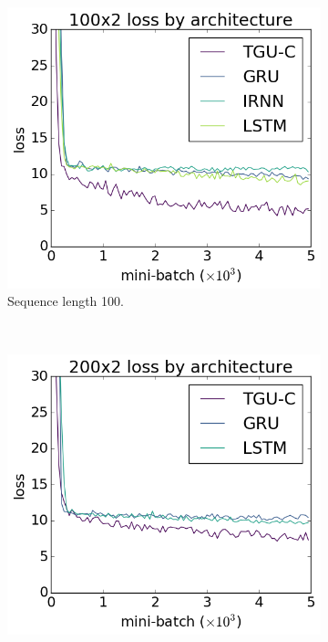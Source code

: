 \begin{figure}[htb]
\centering
\begin{subfigure}[t]{0.3\linewidth}
	\includegraphics[width=\linewidth]{exps/vbind/plots/100x2}
	\caption{Sequence length 100.}
\end{subfigure}~
\begin{subfigure}[t]{0.3\linewidth}
	\includegraphics[width=\linewidth]{exps/vbind/plots/200x2}

\end{subfigure}
\end{figure}
